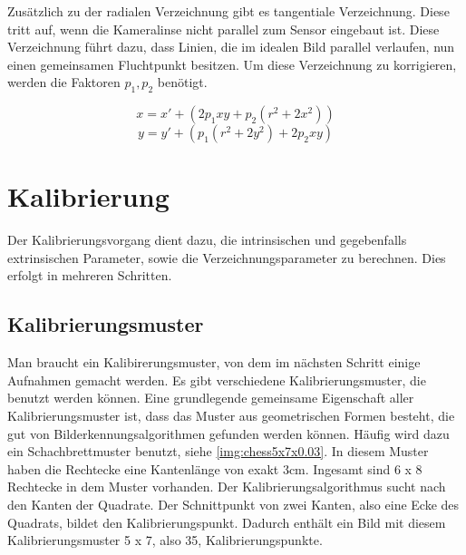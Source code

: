Zusätzlich zu der radialen Verzeichnung gibt es tangentiale Verzeichnung. Diese tritt auf, wenn die Kameralinse nicht parallel zum Sensor eingebaut ist. Diese Verzeichnung führt dazu, dass Linien, die im idealen Bild parallel verlaufen, nun einen gemeinsamen Fluchtpunkt besitzen. Um diese Verzeichnung zu korrigieren, werden die Faktoren $p_1, p_2$ benötigt.

\begin{equation}
	x = x' + (2 p_1 xy + p_2 (r^2 + 2 x^2))
\end{equation}
\begin{equation}
	y = y' + (p_1(r^2 + 2 y^2) + 2p_2 xy)
\end{equation}

\section{Kalibrierung} %
\label{sec:kalibrierung}
Der Kalibrierungsvorgang dient dazu, die intrinsischen und gegebenfalls extrinsischen Parameter, sowie die Verzeichnungsparameter zu berechnen. Dies erfolgt in mehreren Schritten.

\subsection{Kalibrierungsmuster} %
\label{sub:kalibrierungsmuster}
Man braucht ein Kalibirerungsmuster, von dem im nächsten Schritt einige Aufnahmen gemacht werden. Es gibt verschiedene Kalibrierungsmuster, die benutzt werden können. Eine grundlegende gemeinsame Eigenschaft aller Kalibrierungsmuster ist, dass das Muster aus geometrischen Formen besteht, die gut von Bilderkennungsalgorithmen gefunden werden können. Häufig wird dazu ein Schachbrettmuster benutzt, siehe \autoref{img:chess5x7x0.03}. In diesem Muster haben die Rechtecke eine Kantenlänge von exakt 3cm. Ingesamt sind 6 x 8 Rechtecke in dem Muster vorhanden. Der Kalibrierungsalgorithmus sucht nach den Kanten der Quadrate. Der Schnittpunkt von zwei Kanten, also eine Ecke des Quadrats, bildet den Kalibrierungspunkt. Dadurch enthält ein Bild mit diesem Kalibrierungsmuster 5 x 7, also 35, Kalibrierungspunkte.

